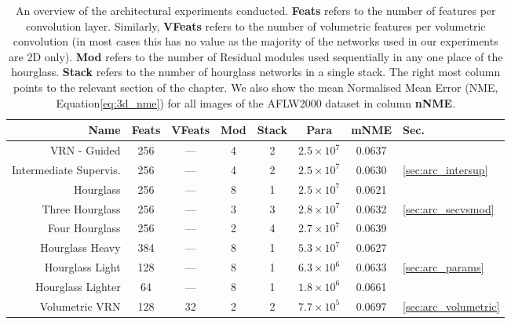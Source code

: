 \begin{table}
  \caption[Overview of architectural experiments]{An overview of the
    architectural experiments conducted. \textbf{Feats} refers to the
    number of features per convolution layer. Similarly,
    \textbf{VFeats} refers to the number of volumetric features per
    volumetric convolution (in most cases this has no value as the
    majority of the networks used in our experiments are 2D
    only). \textbf{Mod} refers to the number of Residual modules used
    sequentially in any one place of the hourglass. \textbf{Stack}
    refers to the number of hourglass networks in a single stack. The
    right most column points to the relevant section of the
    chapter. We also show the mean Normalised Mean Error (NME,
    Equation\ref{eq:3d_nme}) for all images of the AFLW2000 dataset in
    column \textbf{nNME}.}
  \label{tab:arcexpoverview}
  \centering
  \small
  \begin{tabular}{|r|| c|c|c|c || c || c|l|}
    \hline
    \textbf{Name} & \textbf{Feats} & \textbf{VFeats} & \textbf{Mod} & \textbf{Stack} &  \textbf{Para} & \textbf{mNME} & \textbf{Sec.} \\
    \hline\hline
    VRN - Guided             & 256    & ---     & 4        & 2  & $2.5\times 10^7$    & 0.0637 &   \\
    \hline
    Intermediate Supervis.   & 256    & ---     & 4        & 2  & $2.5\times 10^7$    & 0.0630 & \ref{sec:arc_intersup}  \\
    \hline
    Hourglass                & 256    & ---     & 8        & 1  & $2.5\times 10^7$    & 0.0621 &   \\
    Three Hourglass          & 256    & ---     & 3        & 3  & $2.8\times 10^7$    & 0.0632 & \ref{sec:arc_secvsmod}  \\
    Four Hourglass           & 256    & ---     & 2        & 4  & $2.7\times 10^7$    & 0.0639 &   \\
    \hline
    Hourglass Heavy          & 384    & ---     & 8        & 1  & $5.3\times 10^7$    & 0.0627 &   \\
    Hourglass Light          & 128    & ---     & 8        & 1  & $6.3\times 10^6$    & 0.0633 & \ref{sec:arc_params}  \\
    Hourglass Lighter        & 64     & ---     & 8        & 1  & $1.8\times 10^6$    & 0.0661 &   \\
    \hline
    Volumetric VRN           & 128    & 32      & 2        & 2  & $7.7\times 10^5$    & 0.0697 & \ref{sec:arc_volumetric} \\
    \hline
  \end{tabular}
\end{table}

